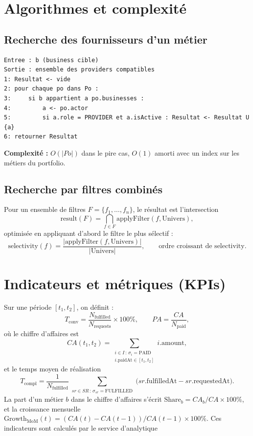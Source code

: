 \section{Algorithmes et complexité}

\subsection{Recherche des fournisseurs d'un métier}
\begin{lstlisting}[language={},caption={FindProvidersByBusiness},captionpos=b]
Entree : b (business cible)
Sortie : ensemble des providers compatibles
1: Resultat <- vide
2: pour chaque po dans Po :
3:     si b appartient a po.businesses :
4:         a <- po.actor
5:         si a.role = PROVIDER et a.isActive : Resultat <- Resultat U {a}
6: retourner Resultat
\end{lstlisting}
\textbf{Complexité :} $O(|Po|)$ dans le pire cas, $O(1)$ amorti avec un index sur les
métiers du portfolio.

\subsection{Recherche par filtres combinés}
Pour un ensemble de filtres $F = \{f_1, \dots, f_n\}$, le résultat est l'intersection
\[
\text{result}(F) = \bigcap_{f \in F} \text{applyFilter}(f, \text{Univers}),
\]
optimisée en appliquant d'abord le filtre le plus sélectif :
\[
\text{selectivity}(f) = \frac{|\text{applyFilter}(f, \text{Univers})|}{|\text{Univers}|},
\qquad \text{ordre croissant de } \text{selectivity}.
\]

\section{Indicateurs et métriques (KPIs)}

Sur une période $[t_1, t_2]$, on définit :
\[
\boxed{T_{\text{conv}} = \frac{N_{\text{fulfilled}}}{N_{\text{requests}}} \times 100\%},
\qquad
\boxed{PA = \frac{CA}{N_{\text{paid}}}},
\]
où le chiffre d'affaires est
\[
CA(t_1, t_2) = \sum_{\substack{i \in I \,:\, \sigma_i = \text{PAID}\\ i.\text{paidAt} \in [t_1,t_2]}}
i.\text{amount},
\]
et le temps moyen de réalisation
\[
\boxed{T_{\text{compl}} = \frac{1}{N_{\text{fulfilled}}}
\sum_{\substack{sr \in SR \,:\, \sigma_{sr} = \text{FULFILLED}}}
\big(sr.\text{fulfilledAt} - sr.\text{requestedAt}\big)}.
\]
La part d'un métier $b$ dans le chiffre d'affaires s'écrit
$\text{Share}_b = CA_b / CA \times 100\%$, et la croissance mensuelle
$\text{Growth}_{\text{MoM}}(t) = (CA(t) - CA(t-1)) / CA(t-1) \times 100\%$. Ces indicateurs
sont calculés par le service d'analytique 


